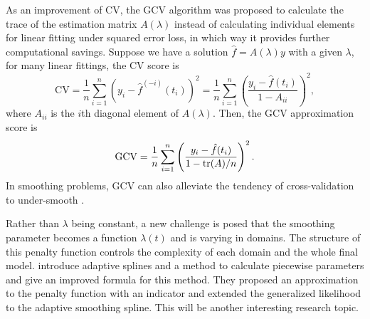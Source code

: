 As an improvement of CV, the GCV algorithm was proposed to calculate the trace of the estimation matrix $A(\lambda)$ instead of calculating individual elements for linear fitting under squared error loss, in which way it provides further computational savings. Suppose we have a solution $\hat{f}=A(\lambda)y$ with a given $\lambda$, for many linear fittings, the CV score is 
\begin{equation*}
\mbox{CV} = \frac{1}{n}\sum_{i=1}^{n} \left( y_i - \hat{f}^{(-i)}(t_i)\right)^2 = \frac{1}{n} \sum_{i=1}^{n}\left( \frac{y_i-\hat{f}(t_i)}{1-A_{ii}}  \right)^2, 
\end{equation*}
where $A_{ii}$ is the $i$th diagonal element of $A(\lambda)$. Then, the GCV approximation score is 
\begin{equation*}
\mbox{GCV} =\frac{1}{n} \sum_{i=1}^{n}\left( \frac{y_i-\hat{f}(t_i)}{1-\mathrm{tr}(A)/n}  \right)^2.
\end{equation*}
In smoothing problems, GCV can also alleviate the tendency of cross-validation to under-smooth \citep{esl2009}. 


Rather than $\lambda$ being constant, a new challenge is posed that the smoothing parameter becomes a function $\lambda(t)$ and is varying in domains. The structure of this penalty function controls the complexity of each domain and the whole final model.  \cite{donoho1995wavelet} introduce adaptive splines and a method to calculate piecewise parameters and \cite{liu2010data} give an improved formula for this method. They proposed an approximation to the penalty function with an indicator and extended the generalized likelihood to the adaptive smoothing spline. This will be another interesting research topic. 






